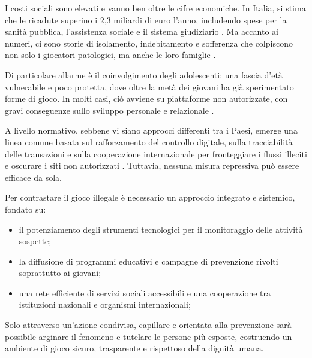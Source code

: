 \documentclass[a4paper,12pt]{article}
\begin{document}
I costi sociali sono elevati e vanno ben oltre le cifre economiche. In Italia, si stima che le ricadute superino i 2,3 miliardi di euro l’anno, includendo spese per la sanità pubblica, l’assistenza sociale e il sistema giudiziario \cite{lucchini2022socialcosts}. Ma accanto ai numeri, ci sono storie di isolamento, indebitamento e sofferenza che colpiscono non solo i giocatori patologici, ma anche le loro famiglie \cite{gorsane2017illegalacts}.

Di particolare allarme è il coinvolgimento degli adolescenti: una fascia d’età vulnerabile e poco protetta, dove oltre la metà dei giovani ha già sperimentato forme di gioco. In molti casi, ciò avviene su piattaforme non autorizzate, con gravi conseguenze sullo sviluppo personale e relazionale \cite{gori2014adolescentgambling}.

A livello normativo, sebbene vi siano approcci differenti tra i Paesi, emerge una linea comune basata sul rafforzamento del controllo digitale, sulla tracciabilità delle transazioni e sulla cooperazione internazionale per fronteggiare i flussi illeciti e oscurare i siti non autorizzati \cite{banks2018taxonomy}. Tuttavia, nessuna misura repressiva può essere efficace da sola.

Per contrastare il gioco illegale è necessario un approccio integrato e sistemico, fondato su:

\begin{itemize}
\item il potenziamento degli strumenti tecnologici per il monitoraggio delle attività sospette;
\item la diffusione di programmi educativi e campagne di prevenzione rivolti soprattutto ai giovani;
\item una rete efficiente di servizi sociali accessibili e una cooperazione tra istituzioni nazionali e organismi internazionali;
\end{itemize}

Solo attraverso un’azione condivisa, capillare e orientata alla prevenzione sarà possibile arginare il fenomeno e tutelare le persone più esposte, costruendo un ambiente di gioco sicuro, trasparente e rispettoso della dignità umana.
\end{document}
